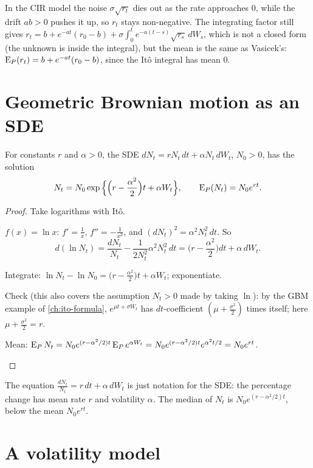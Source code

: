 In the CIR model the noise $\sigma\sqrt{r_t}$ dies out as the rate approaches $0$, while the drift $ab>0$ pushes it up, so $r_t$ stays non-negative. The integrating factor still gives $r_t=b+e^{-at}(r_0-b)+\sigma\int_0^te^{-a(t-s)}\sqrt{r_s}\,dW_s$, which is not a closed form (the unknown is inside the integral), but the mean is the same as Vasicek's: $\operatorname{E}_P(r_t)=b+e^{-at}(r_0-b)$, since the Itô integral has mean $0$.

\section{Geometric Brownian motion as an SDE}

\begin{theorem}
\label{thm:gbm-sde}
For constants $r$ and $\alpha>0$, the SDE $dN_t=rN_t\,dt+\alpha N_t\,dW_t$, $N_0>0$, has the solution
\[
  N_t=N_0\exp\Big\{\Big(r-\frac{\alpha^2}2\Big)t+\alpha W_t\Big\},\qquad \operatorname{E}_P(N_t)=N_0e^{rt}.
\]
\end{theorem}
\begin{proof}
Take logarithms with Itô.
\begin{steps}
  \item $f(x)=\ln x$: $f'=\frac1x$, $f''=-\frac1{x^2}$, and $(dN_t)^2=\alpha^2N_t^2\,dt$. So
  \[
    d(\ln N_t)=\frac{dN_t}{N_t}-\frac{1}{2N_t^2}\alpha^2N_t^2\,dt=\Big(r-\frac{\alpha^2}2\Big)dt+\alpha\,dW_t .
  \]
  \item Integrate: $\ln N_t-\ln N_0=\big(r-\frac{\alpha^2}{2}\big)t+\alpha W_t$; exponentiate.
  \item Check (this also covers the assumption $N_t>0$ made by taking $\ln$): by the GBM example of \cref{ch:ito-formula}, $e^{\mu t+\sigma W_t}$ has $dt$-coefficient $(\mu+\frac{\sigma^2}{2})$ times itself; here $\mu+\frac{\sigma^2}2=r$.
  \item Mean: $\operatorname{E}_PN_t=N_0e^{(r-\alpha^2/2)t}\operatorname{E}_Pe^{\alpha W_t}=N_0e^{(r-\alpha^2/2)t}e^{\alpha^2t/2}=N_0e^{rt}$. \qedhere
\end{steps}
\end{proof}

The equation $\frac{dN_t}{N_t}=r\,dt+\alpha\,dW_t$ is just notation for the SDE: the percentage change has mean rate $r$ and volatility $\alpha$. The median of $N_t$ is $N_0e^{(r-\alpha^2/2)t}$, below the mean $N_0e^{rt}$.

\section{A volatility model}

